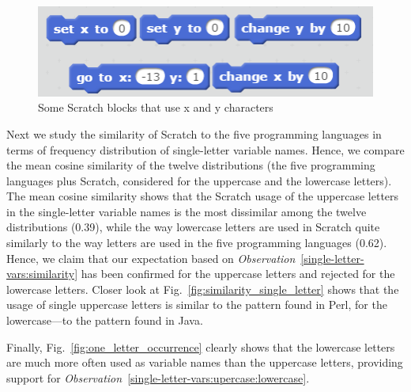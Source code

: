 \documentclass[conference]{IEEEtran}
\begin{document}
\begin{figure}[h]
	\begin{center}
		\includegraphics[scale=0.5]{fig/builtinblocks_xy}
		\caption{Some Scratch blocks that use x and y characters}
		\label{fig:xy_Scratchblocks}
	\end{center}
\end{figure} 

Next we study the similarity of Scratch to the five programming languages in terms of frequency distribution of single-letter variable names.
Hence, we compare the mean cosine similarity of the twelve distributions (the five programming languages plus Scratch, considered for the uppercase and the lowercase letters).
The mean cosine similarity shows that the Scratch usage of the uppercase letters in the single-letter variable names is the most dissimilar among the
twelve distributions (0.39), while the way lowercase letters are used in Scratch quite similarly to the way letters are used in the five programming languages (0.62).
Hence, we claim that our expectation based on \emph{Observation}~\ref{single-letter-vars:similarity} has been confirmed for the uppercase letters and  rejected for the lowercase letters. 
Closer look at Fig.~\ref{fig:similarity_single_letter} shows that the usage of single uppercase letters is similar to the pattern found in Perl, for the lowercase---to the pattern found in Java.

Finally, Fig.~\ref{fig:one_letter_occurrence} clearly shows that the lowercase letters are much more often used as variable names than the uppercase letters, providing support for \emph{Observation}~\ref{single-letter-vars:upercase:lowercase}.
\end{document}
